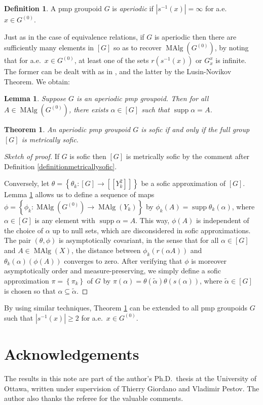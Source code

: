 \documentclass[11pt]{amsart}
\theoremstyle{plain}    \newtheorem{theorem}[generalnumbering]{Theorem}
\theoremstyle{plain}    \newtheorem{corollary}[generalnumbering]{Corollary}
\theoremstyle{definition}   \newtheorem{definition}[generalnumbering]{Definition}
\theoremstyle{definition}   \newtheorem{example}[generalnumbering]{Example}
\theoremstyle{plain}    \newtheorem{proposition}[generalnumbering]{Proposition}
\theoremstyle{plain}    \newtheorem{lemma}[generalnumbering]{Lemma}
\theoremstyle{plain}    \newtheorem{plainstyle}[generalnumbering]{\namefordifferentenvironment}
\theoremstyle{plain}    \newtheorem*{plainstyle*}{\namefordifferentenvironment}
\theoremstyle{definition}    \newtheorem{definitionstyle}[generalnumbering]{\namefordifferentenvironment}
\theoremstyle{definition}    \newtheorem*{definitionstyle*}{\namefordifferentenvironment}
\begin{document}
\begin{definition}
A pmp groupoid $G$ is \emph{aperiodic} if $|s^{-1}(x)|=\infty$ for a.e.\ $x\in G^{(0)}$.
\end{definition}

Just as in the case of equivalence relations, if $G$ is aperiodic then there are sufficiently many elements in $[G]$ so as to recover $\operatorname{MAlg}(G^{(0)})$, by noting that for a.e.\ $x\in G^{(0)}$, at least one of the sets $r(s^{-1}(x))$ or $G_x^x$ is infinite. The former can be dealt with as in \cite[Lemma 4.10]{MR2583950}, and the latter by the Lusin-Novikov Theorem. We obtain:

\begin{lemma}\label{lemmaaperiodicsupport}
Suppose $G$ is an aperiodic pmp groupoid. Then for all $A\in\operatorname{MAlg}(G^{(0)})$, there exists $\alpha\in[G]$ such that $\operatorname{supp}\alpha=A$.
\end{lemma}

\begin{theorem}\label{theoremfirstimportant}
An aperiodic pmp groupoid $G$ is sofic if and only if the full group $[G]$ is metrically sofic.
\end{theorem}
\begin{proof}[Sketch of proof]
If $G$ is sofic then $[G]$ is metrically sofic by the comment after Definition \ref{definitionmetricallysofic}.

Conversely, let $\theta=\left\{\theta_k:[G]\to[[Y_k^2]]\right\}$ be a sofic approximation of $[G]$. Lemma \ref{lemmaaperiodicsupport} allows us to define a sequence of maps $\phi=\left\{\phi_k:\operatorname{MAlg}(G^{(0)})\to\operatorname{MAlg}(Y_k)\right\}$ by $\phi_k(A)=\operatorname{supp}\theta_k(\alpha)$, where $\alpha\in[G]$ is any element with $\operatorname{supp}\alpha=A$. This way, $\phi(A)$ is independent of the choice of $\alpha$ up to null sets, which are disconsidered in sofic approximations. The pair $(\theta,\phi)$ is asymptotically covariant, in the sense that for all $\alpha\in[G]$ and $A\in\operatorname{MAlg}(X)$, the distance between $\phi_k(r(\alpha A))$ and $\theta_k(\alpha)(\phi(A))$ converges to zero. After verifying that $\phi$ is moreover asymptotically order and measure-preserving, we simply define a sofic approximation $\pi=\left\{\pi_k\right\}$ of $G$ by $\pi(\alpha)=\theta(\widetilde{\alpha})\theta(s(\alpha))$, where $\widetilde{\alpha}\in[G]$ is chosen so that $\alpha\subseteq\widetilde{\alpha}$.\qedhere
\end{proof}

By using similar techniques, Theorem \ref{theoremfirstimportant} can be extended to all pmp groupoids $G$ such that $|s^{-1}(x)|\geq 2$ for a.e.\ $x\in G^{(0)}$.

\section*{Acknowledgements}
The results in this note are part of the author's Ph.D.\ thesis at the University of Ottawa, written under supervision of Thierry Giordano and Vladimir Pestov. The author also thanks the referee for the valuable comments.



\end{document}
